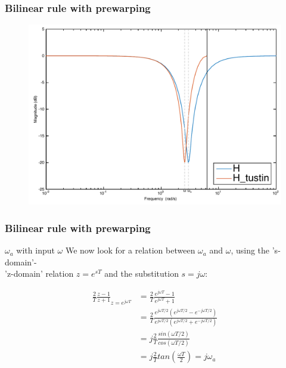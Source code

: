 \begin{frame}
	\frametitle{Bilinear rule with prewarping}
	\vspace{-0.5em}
	\begin{figure}
		\centering
		\includegraphics[width=0.85\linewidth]{Distortion_bode}
	\end{figure}
\end{frame}

\begin{frame}
	\frametitle{Bilinear rule with prewarping}
	\begin{block}{$\omega_a$ with input $\omega$}
		We now look for a relation between $\omega_a$ and $\omega$, using the 's-domain'-\\'z-domain' relation $z = e^{sT}$ and the substitution $s=j\omega$:
		\vspace{-2em} 
		\begin{center}
			\begin{align*}
			\frac{2}{T} \frac{z-1}{z+1}_{z = e^{j\omega T}} &=\frac{2}{T} \frac{e^{j\omega T}-1}{e^{j\omega T}+1}\\
			&= \frac{2}{T} \frac{e^{j\omega T/2} (e^{j\omega T/2} - e^{-j\omega T/2})}{e^{j\omega T/2}(e^{j\omega T/2} + e^{-j\omega T/2})}\\
			&= j \frac{2}{T} \frac{sin(\omega T/2)}{cos(\omega T/2)}\\
			&= j \frac{2}{T} tan(\frac{\omega T}{2}) = j\omega_a
			\end{align*}
		\end{center}
	\end{block}
\end{frame}

